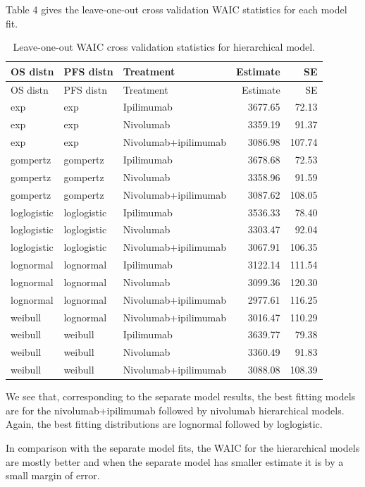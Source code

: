\documentclass[
]{article}
\begin{document}
Table 4 gives the leave-one-out cross validation WAIC statistics for
each model fit.

\begin{longtable}[]{@{}lllrr@{}}
\caption{Leave-one-out WAIC cross validation statistics for hierarchical
model.}\tabularnewline
\toprule
OS distn & PFS distn & Treatment & Estimate & SE \\
\midrule
\endfirsthead
\toprule
OS distn & PFS distn & Treatment & Estimate & SE \\
\midrule
\endhead
exp & exp & Ipilimumab & 3677.65 & 72.13 \\
exp & exp & Nivolumab & 3359.19 & 91.37 \\
exp & exp & Nivolumab+ipilimumab & 3086.98 & 107.74 \\
gompertz & gompertz & Ipilimumab & 3678.68 & 72.53 \\
gompertz & gompertz & Nivolumab & 3358.96 & 91.59 \\
gompertz & gompertz & Nivolumab+ipilimumab & 3087.62 & 108.05 \\
loglogistic & loglogistic & Ipilimumab & 3536.33 & 78.40 \\
loglogistic & loglogistic & Nivolumab & 3303.47 & 92.04 \\
loglogistic & loglogistic & Nivolumab+ipilimumab & 3067.91 & 106.35 \\
lognormal & lognormal & Ipilimumab & 3122.14 & 111.54 \\
lognormal & lognormal & Nivolumab & 3099.36 & 120.30 \\
lognormal & lognormal & Nivolumab+ipilimumab & 2977.61 & 116.25 \\
weibull & lognormal & Nivolumab+ipilimumab & 3016.47 & 110.29 \\
weibull & weibull & Ipilimumab & 3639.77 & 79.38 \\
weibull & weibull & Nivolumab & 3360.49 & 91.83 \\
weibull & weibull & Nivolumab+ipilimumab & 3088.08 & 108.39 \\
\bottomrule
\end{longtable}

We see that, corresponding to the separate model results, the best
fitting models are for the nivolumab+ipilimumab followed by nivolumab
hierarchical models. Again, the best fitting distributions are lognormal
followed by loglogistic.

In comparison with the separate model fits, the WAIC for the
hierarchical models are mostly better and when the separate model has
smaller estimate it is by a small margin of error.
\end{document}
